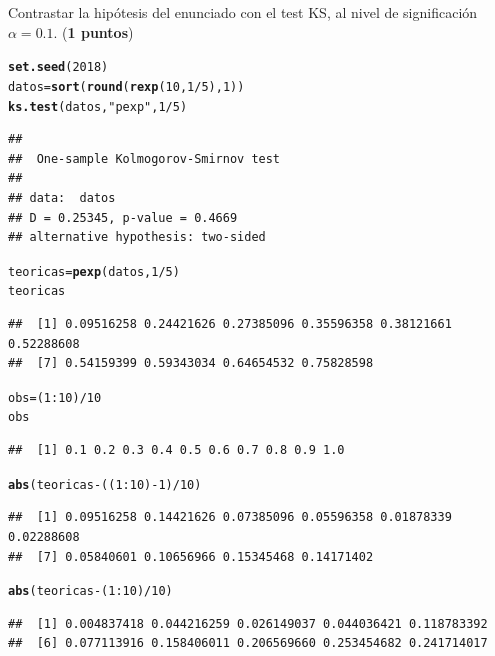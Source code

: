 \documentclass[10pt]{article}\usepackage[]{graphicx}\usepackage[]{color}
\makeatletter
\newcommand{\hlnum}[1]{\textcolor[rgb]{0.686,0.059,0.569}{#1}}%
\newcommand{\hlstr}[1]{\textcolor[rgb]{0.192,0.494,0.8}{#1}}%
\newcommand{\hlopt}[1]{\textcolor[rgb]{0,0,0}{#1}}%
\newcommand{\hlstd}[1]{\textcolor[rgb]{0.345,0.345,0.345}{#1}}%
\newcommand{\hlkwb}[1]{\textcolor[rgb]{0.69,0.353,0.396}{#1}}%
\newcommand{\hlkwd}[1]{\textcolor[rgb]{0.737,0.353,0.396}{\textbf{#1}}}%
\newenvironment{kframe}{%
 \def\at@end@of@kframe{}%
 \ifinner\ifhmode%
  \def\at@end@of@kframe{\end{minipage}}%
  \begin{minipage}{\columnwidth}%
 \fi\fi%
 \def\FrameCommand##1{\hskip\@totalleftmargin \hskip-\fboxsep
 \colorbox{shadecolor}{##1}\hskip-\fboxsep
     \hskip-\linewidth \hskip-\@totalleftmargin \hskip\columnwidth}%
 \MakeFramed {\advance\hsize-\width
   \@totalleftmargin\z@ \linewidth\hsize
   \@setminipage}}%
 {\par\unskip\endMakeFramed%
 \at@end@of@kframe}
\newenvironment{knitrout}{}{} %
\newcounter{punts} \def\thepunts{\arabic{punts}}
\def\punt{\addtocounter{punts}{1} \smallskip{\emph{\thepunts) }}}
\makeatother
\begin{document}
\punt   Contrastar la hipótesis del enunciado con el test KS, al nivel de significación $\alpha=0.1$. (\textbf{1 puntos})
\begin{knitrout}
\color{fgcolor}\begin{kframe}
\begin{alltt}
\hlkwd{set.seed}\hlstd{(}\hlnum{2018}\hlstd{)}
\hlstd{datos}\hlkwb{=}\hlkwd{sort}\hlstd{(}\hlkwd{round}\hlstd{(}\hlkwd{rexp}\hlstd{(}\hlnum{10}\hlstd{,}\hlnum{1}\hlopt{/}\hlnum{5}\hlstd{),}\hlnum{1}\hlstd{))}
\hlkwd{ks.test}\hlstd{(datos,}\hlstr{"pexp"}\hlstd{,}\hlnum{1}\hlopt{/}\hlnum{5}\hlstd{)}
\end{alltt}
\begin{verbatim}
## 
## 	One-sample Kolmogorov-Smirnov test
## 
## data:  datos
## D = 0.25345, p-value = 0.4669
## alternative hypothesis: two-sided
\end{verbatim}
\begin{alltt}
\hlstd{teoricas}\hlkwb{=}\hlkwd{pexp}\hlstd{(datos,}\hlnum{1}\hlopt{/}\hlnum{5}\hlstd{)}
\hlstd{teoricas}
\end{alltt}
\begin{verbatim}
##  [1] 0.09516258 0.24421626 0.27385096 0.35596358 0.38121661 0.52288608
##  [7] 0.54159399 0.59343034 0.64654532 0.75828598
\end{verbatim}
\begin{alltt}
\hlstd{obs}\hlkwb{=}\hlstd{(}\hlnum{1}\hlopt{:}\hlnum{10}\hlstd{)}\hlopt{/}\hlnum{10}
\hlstd{obs}
\end{alltt}
\begin{verbatim}
##  [1] 0.1 0.2 0.3 0.4 0.5 0.6 0.7 0.8 0.9 1.0
\end{verbatim}
\begin{alltt}
\hlkwd{abs}\hlstd{(teoricas}\hlopt{-} \hlstd{((}\hlnum{1}\hlopt{:}\hlnum{10}\hlstd{)}\hlopt{-}\hlnum{1}\hlstd{)}\hlopt{/}\hlnum{10}\hlstd{)}
\end{alltt}
\begin{verbatim}
##  [1] 0.09516258 0.14421626 0.07385096 0.05596358 0.01878339 0.02288608
##  [7] 0.05840601 0.10656966 0.15345468 0.14171402
\end{verbatim}
\begin{alltt}
\hlkwd{abs}\hlstd{(teoricas}\hlopt{-} \hlstd{(}\hlnum{1}\hlopt{:}\hlnum{10}\hlstd{)}\hlopt{/}\hlnum{10}\hlstd{)}
\end{alltt}
\begin{verbatim}
##  [1] 0.004837418 0.044216259 0.026149037 0.044036421 0.118783392
##  [6] 0.077113916 0.158406011 0.206569660 0.253454682 0.241714017

\end{verbatim}
\end{kframe}
\end{knitrout}
\end{document}
